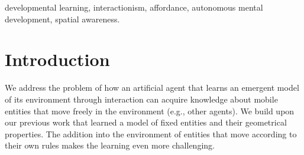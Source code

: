 \documentclass[conference]{IEEEtran}
\begin{document}
\begin{IEEEkeywords}
developmental learning, interactionism, affordance, autonomous mental development, spatial awareness.
\end{IEEEkeywords}

\section{Introduction}

We address the problem of how an artificial agent that learns an emergent model of its environment through interaction can acquire knowledge about mobile entities that move freely in the environment (e.g., other agents). 
We build upon our previous work that learned a model of fixed entities and their geometrical properties. The addition into the environment of entities that move according to their own rules makes the learning even more challenging.





\end{document}
